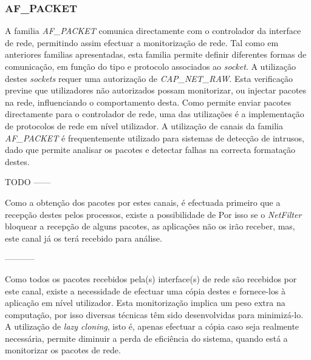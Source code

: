 \subsubsection{AF\_PACKET}
\label{subsub:af_packet}

A familia \textit{AF\_PACKET} comunica directamente com o controlador da interface de rede, permitindo assim efectuar a monitorização de rede.
Tal como em anteriores familias apresentadas, esta familia permite definir diferentes formas de comunicação, em função do tipo e protocolo associados ao \textit{socket}.
A utilização destes \textit{sockets} requer uma autorização de \textit{CAP\_NET\_RAW}.
Esta verificação previne que utilizadores não autorizados possam monitorizar, ou injectar pacotes na rede, influenciando o comportamento desta.
Como permite enviar pacotes directamente para o controlador de rede, uma das utilizações é a implementação de protocolos de rede em nível utilizador.
A utilização de canais da familia \textit{AF\_PACKET} é frequentemente utilizado para sistemas de detecção de intrusos, dado que permite analisar os pacotes e detectar falhas na correcta formatação destes.

TODO ------

Como a obtenção dos pacotes por estes canais, é efectuada primeiro que a recepção destes pelos processos, existe a possibilidade de 
Por isso se o \textit{NetFilter} bloquear a recepção de alguns pacotes, as aplicações não os irão receber, mas, este canal já os terá recebido para análise.

-----------


 
 

Como todos os pacotes recebidos pela(s) interface(s) de rede são recebidos por este canal, existe a necessidade de efectuar uma cópia destes e fornece-los à aplicação em nível utilizador.
Esta monitorização implica um peso extra na computação, por isso diversas técnicas têm sido desenvolvidas para minimizá-lo.
A utilização de \textit{lazy cloning}, isto é, apenas efectuar a cópia caso seja realmente necessária, permite diminuir a perda de eficiência do sistema, quando está a monitorizar os pacotes de rede.

